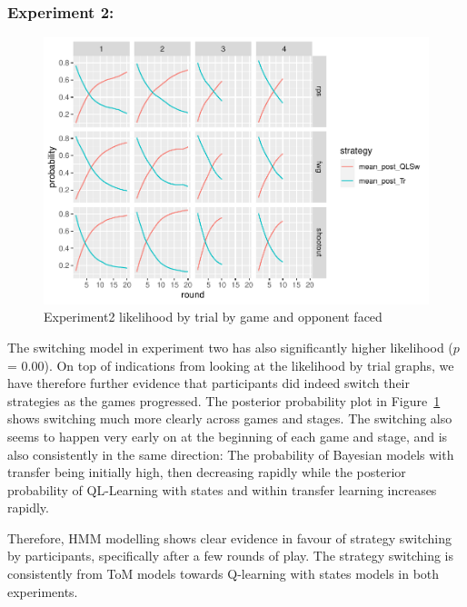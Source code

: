 \documentclass[man,floatsintext]{apa6}
\begin{document}
\hypertarget{experiment-2-2}{%
\subsubsection{Experiment 2:}\label{experiment-2-2}}

\begin{figure}

{\centering \includegraphics{draft_upgrade_v1_files/figure-latex/exp2-posteriors-plot-1} 

}

\caption{Experiment2 likelihood by trial by game and opponent faced}\label{fig:exp2-posteriors-plot}
\end{figure}

The switching model in experiment two has also significantly higher likelihood (\(p\) = 0.00). On top of indications from looking at the likelihood by trial graphs, we have therefore further evidence that participants did indeed switch their strategies as the games progressed. The posterior probability plot in Figure~\ref{fig:exp2-posteriors-plot} shows switching much more clearly across games and stages. The switching also seems to happen very early on at the beginning of each game and stage, and is also consistently in the same direction: The probability of Bayesian models with transfer being initially high, then decreasing rapidly while the posterior probability of QL-Learning with states and within transfer learning increases rapidly.

Therefore, HMM modelling shows clear evidence in favour of strategy switching by participants, specifically after a few rounds of play. The strategy switching is consistently from ToM models towards Q-learning with states models in both experiments.
\end{document}
